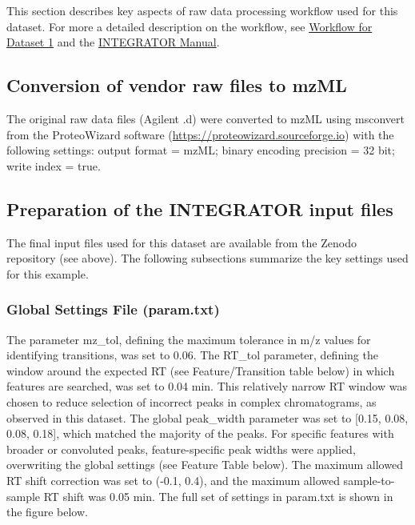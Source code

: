 \documentclass[
  letterpaper,
  DIV=11,
  numbers=noendperiod]{scrartcl}
\begin{document}
This section describes key aspects of raw data processing workflow used
for this dataset. For more a detailed description on the workflow, see
\href{https://slinghub.github.io/mrmhub-workflows/Dataset1.html}{Workflow
for Dataset 1} and the \hyperref[0]{INTEGRATOR Manual}.

\subsection{Conversion of vendor raw files to
mzML}\label{conversion-of-vendor-raw-files-to-mzml}

The original raw data files (Agilent .d) were converted to mzML using
msconvert from the ProteoWizard software
(\href{https://proteowizard.sourceforge.io/}{https://proteowizard.sourceforge.io})
with the following settings: output format = mzML; binary encoding
precision = 32 bit; write index = true.

\subsection{Preparation of the INTEGRATOR input
files}\label{preparation-of-the-integrator-input-files}

The final input files used for this dataset are available from the
Zenodo repository (see above). The following subsections summarize the
key settings used for this example.

\subsubsection{Global Settings File
(param.txt)}\label{global-settings-file-param.txt}

The parameter mz\_tol, defining the maximum tolerance in m/z values for
identifying transitions, was set to 0.06. The RT\_tol parameter,
defining the window around the expected RT (see Feature/Transition table
below) in which features are searched, was set to 0.04 min. This
relatively narrow RT window was chosen to reduce selection of incorrect
peaks in complex chromatograms, as observed in this dataset. The global
peak\_width parameter was set to {[}0.15, 0.08, 0.08, 0.18{]}, which
matched the majority of the peaks. For specific features with broader or
convoluted peaks, feature-specific peak widths were applied, overwriting
the global settings (see Feature Table below). The maximum allowed RT
shift correction was set to (-0.1, 0.4), and the maximum allowed
sample-to-sample RT shift was 0.05 min. The full set of settings in
param.txt is shown in the figure below.
\end{document}
